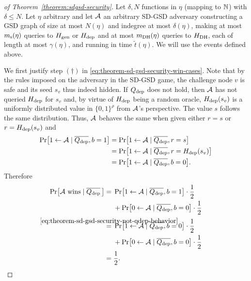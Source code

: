 \begin{proof}[of Theorem~\ref{theorem:sdgsd-security}]
	Let $\delta, N$ functions in $\eta$ (mapping to $\mathbb{N}$) with $\delta \le N$.
	Let $\eta$ arbitrary and let $\mathcal{A}$ an arbitrary SD-GSD adversary constructing a GSD graph of size at most $N(\eta)$ and indegree at most $\delta(\eta)$, making at most $m_\mathrm{s}(\eta)$ queries to $H_\mathrm{gen}$ or $H_\mathrm{dep}$ and at most $m_\mathrm{DH}(\eta)$ queries to $H_\mathrm{DH}$, each of length at most $\gamma(\eta)$, and running in time $\tilde{t}(\eta)$. We will use the events defined above.

	We first justify step $(\dagger)$ in \eqref{eq:theorem-sd-gsd-security-win-cases}. Note that by the rules imposed on the adversary in the SD-GSD game, the challenge node $v$ is safe and its seed $s_v$ thus indeed hidden. If $Q_\mathrm{dep}$ does not hold, then $\mathcal{A}$ has not queried $H_\mathrm{dep}$ for $s_v$ and, by virtue of $H_\mathrm{dep}$ being a random oracle, $H_\mathrm{dep}(s_v)$ is a uniformly distributed value in $\{0, 1\}^\rho$ from $\mathcal{A}$'s perspective. The value $s$ follows the same distribution. Thus, $\mathcal{A}$ behaves the same when given either $r = s$ or $r = H_\mathrm{dep}(s_v)$ and
	\begin{align} \label{eq:theorem-sd-gsd-security-not-qdep-behavior}
		\begin{split}
			\pr{1 \from \adv \mid \overline{\qdep}, b = 1} & = \pr{1 \from \adv \mid \overline{\qdep}, r = s}          \\
			& = \pr{1 \from \adv \mid \overline{\qdep}, r = \hdep(s_v)} \\
			& = \pr{1 \from \adv \mid \overline{\qdep}, b = 0}.
		\end{split}
	\end{align}
	Therefore
	\begin{align*}
		\pr{\wins \mid \overline{\qdep} \,} & = \begin{aligned}[t]
			                                         & \pr{1 \from \adv \mid \overline{\qdep}, b = 1} \cdot \frac{1}{2}   \\
			                                         & + \pr{0 \from \adv \mid \overline{\qdep}, b = 0} \cdot \frac{1}{2}
		                                        \end{aligned}                                                                             \\
		                                    & \stackrel{\mathclap{\eqref{eq:theorem-sd-gsd-security-not-qdep-behavior}}}{=} \begin{aligned}[t]
			                                                                                                                     & \pr{1 \from \adv \mid \overline{\qdep}, b = 0} \cdot \frac{1}{2}   \\
			                                                                                                                     & + \pr{0 \from \adv \mid \overline{\qdep}, b = 0} \cdot \frac{1}{2}
		                                                                                                                    \end{aligned} \\
		                                    & = \frac{1}{2}.
	\end{align*}


\end{proof}
